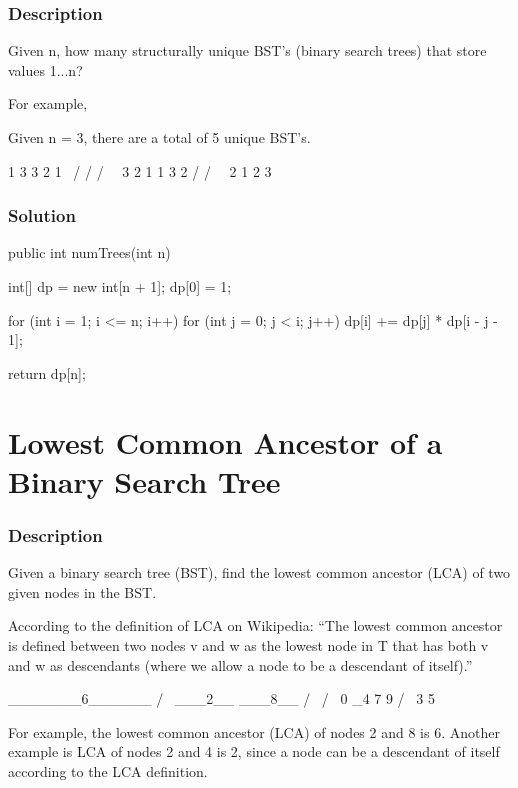 \subsubsection{Description}

Given n, how many structurally unique BST's (binary search trees) that store values 1...n?

For example,

Given n = 3, there are a total of 5 unique BST's.
\begin{Code}
   1         3     3      2      1
    \       /     /      / \      \
     3     2     1      1   3      2
    /     /       \                 \
   2     1         2                 3
\end{Code}

\subsubsection{Solution}
\begin{Code}
public int numTrees(int n) {
    int[] dp = new int[n + 1];
    dp[0] = 1;

    for (int i = 1; i <= n; i++) {
        for (int j = 0; j < i; j++) {
            dp[i] += dp[j] * dp[i - j - 1];
        }
    }

    return dp[n];
}
\end{Code}

\newpage

\section{Lowest Common Ancestor of a Binary Search Tree} %

\subsubsection{Description}

Given a binary search tree (BST), find the lowest common ancestor (LCA) of two given nodes in the BST.

According to the definition of LCA on Wikipedia: “The lowest common ancestor is defined between two nodes v and w as the lowest node in T that has both v and w as descendants (where we allow a node to be a descendant of itself).”
\begin{Code}
        _______6______
       /              \
    ___2__          ___8__
   /      \        /      \
   0      _4       7       9
         /  \
         3   5
\end{Code}
For example, the lowest common ancestor (LCA) of nodes 2 and 8 is 6. Another example is LCA of nodes 2 and 4 is 2, since a node can be a descendant of itself according to the LCA definition.

